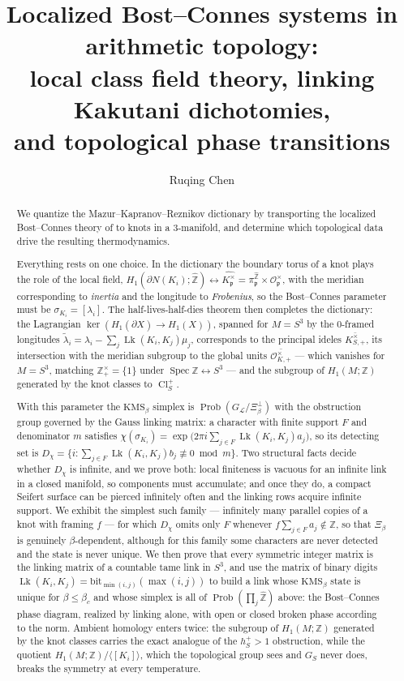 \documentclass[11pt]{amsart}
\title[Bost--Connes systems in arithmetic topology]{Localized Bost--Connes systems in arithmetic topology:\\ local class field theory, linking Kakutani dichotomies,\\ and topological phase transitions}
\author{Ruqing Chen}
\date{}
\numberwithin{equation}{section}
\theoremstyle{definition}
\theoremstyle{remark}
\newcommand{\Z}{\mathbb{Z}}
\newcommand{\hZ}{\widehat{\Z}}
\newcommand{\cL}{\mathcal{L}}
\newcommand{\cO}{\mathcal{O}}
\newcommand{\pp}{\mathfrak{p}}
\newcommand{\Cl}{\operatorname{Cl}}
\newcommand{\Lk}{\operatorname{Lk}}
\newcommand{\Prob}{\operatorname{Prob}}
\newcommand{\Spec}{\operatorname{Spec}}
\newcommand{\tlam}{\widetilde\lambda}
\begin{document}
\begin{abstract}
We quantize the Mazur--Kapranov--Reznikov dictionary \cite{Mazur,Kapranov,Reznikov,Morishita}
by transporting the localized Bost--Connes theory of \cite{Main} to knots in a
$3$-manifold, and determine which topological data drive the resulting thermodynamics.

Everything rests on one choice. In the dictionary the boundary torus of a knot plays the
role of the local field, $H_1(\partial N(K_i);\hZ)\leftrightarrow\widehat{K_\pp^\times}=\pi_\pp^{\hZ}\times\cO_\pp^\times$,
with the meridian corresponding to \emph{inertia} and the longitude to \emph{Frobenius}, so
the Bost--Connes parameter must be $\sigma_{K_i}=[\lambda_i]$. The half-lives-half-dies
theorem then completes the dictionary: the Lagrangian $\ker(H_1(\partial X)\to H_1(X))$,
spanned for $M=S^3$ by the $0$-framed longitudes $\tlam_i=\lambda_i-\sum_j\Lk(K_i,K_j)\mu_j$,
corresponds to the principal ideles $\overline{K^\times_{S,+}}$, its intersection with the
meridian subgroup to the global units $\overline{\cO^\times_{K,+}}$ --- which vanishes for
$M=S^3$, matching $\Z^\times_+=\{1\}$ under $\Spec\Z\leftrightarrow S^3$ --- and the subgroup
of $H_1(M;\Z)$ generated by the knot classes to $\Cl^+_S$.

With this parameter the $\mathrm{KMS}_\beta$ simplex is $\Prob(G_\cL/\Xi_\beta^\perp)$ with
the obstruction group governed by the Gauss linking matrix: a character with finite support
$F$ and denominator $m$ satisfies
$\chi(\sigma_{K_i})=\exp\bigl(2\pi i\sum_{j\in F}\Lk(K_i,K_j)a_j\bigr)$, so its detecting set
is $D_\chi=\{i:\sum_{j\in F}\Lk(K_i,K_j)b_j\not\equiv0\bmod m\}$. Two structural facts decide
whether $D_\chi$ is infinite, and we prove both: local finiteness is vacuous for an infinite
link in a closed manifold, so components must accumulate; and once they do, a compact Seifert
surface can be pierced infinitely often and the linking rows acquire infinite support. We
exhibit the simplest such family --- infinitely many parallel copies of a knot with framing
$f$ --- for which $D_\chi$ omits only $F$ whenever $f\sum_{j\in F}a_j\notin\Z$, so that
$\Xi_\beta$ is genuinely $\beta$-dependent, although for this family some characters are
never detected and the state is never unique. We then prove that every symmetric integer
matrix is the linking matrix of a countable tame link in $S^3$, and use the matrix of
binary digits $\Lk(K_i,K_j)=\mathrm{bit}_{\min(i,j)}(\max(i,j))$ to build a link whose
$\mathrm{KMS}_\beta$ state is unique for $\beta\le\beta_c$ and whose simplex is all of
$\Prob(\prod_j\hZ)$ above: the Bost--Connes phase diagram, realized by linking alone, with
open or closed broken phase according to the norm. Ambient homology enters twice: the
subgroup of $H_1(M;\Z)$ generated by the knot classes carries the exact analogue of the
$h^+_S>1$ obstruction, while the quotient $H_1(M;\Z)/\langle[K_i]\rangle$, which the
topological group sees and $G_S$ never does, breaks the symmetry at every temperature.


\end{abstract}
\end{document}
